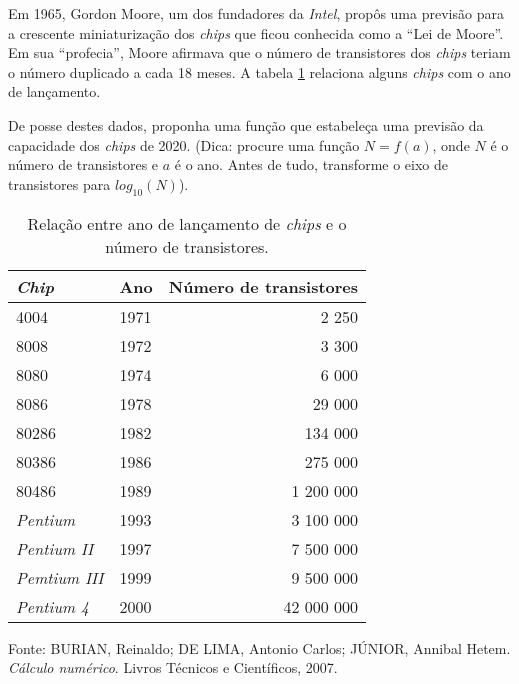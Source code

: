 \begin{ex}
Em 1965, Gordon Moore, um dos fundadores da \emph{Intel}, propôs uma previsão para a crescente miniaturização dos \emph{chips} que ficou conhecida como a ``Lei de Moore''. Em sua ``profecia'', Moore afirmava que o número de transistores dos \emph{chips} teriam o número duplicado a cada 18 meses. A tabela \ref{chips} relaciona alguns \emph{chips} com o ano de lançamento.


De posse destes dados, proponha uma função que estabeleça uma previsão da capacidade dos \emph{chips} de 2020. (Dica: procure uma função $N=f(a)$, onde $N$ é o número de transistores e $a$ é o ano. Antes de tudo, transforme o eixo de transistores para $log_{10}(N)$).
\begin{table}[]
\centering
\caption{Relação entre ano de lançamento de \emph{chips} e o número de transistores.}
\label{chips}
\begin{tabular}{@{}llr@{}}
\toprule
\emph{Chip}        & Ano  & Número de transistores \\ \midrule
4004                 & 1971 & 2 250                  \\
8008                 & 1972 & 3 300                  \\
8080                 & 1974 & 6 000                  \\
8086                 & 1978 & 29 000                 \\
80286                & 1982 & 134 000                \\
80386                & 1986 & 275 000                \\
80486                & 1989 & 1 200 000              \\
\emph{Pentium}     & 1993 & 3 100 000              \\
\emph{Pentium II}  & 1997 & 7 500 000              \\
\emph{Pemtium III} & 1999 & 9 500 000              \\
\emph{Pentium 4}   & 2000 & 42 000 000             \\ \bottomrule
\end{tabular}


Fonte: BURIAN, Reinaldo; DE LIMA, Antonio Carlos; JÚNIOR, Annibal Hetem. \emph{Cálculo numérico}. Livros Técnicos e Científicos, 2007.
\end{table}

\end{ex}

%
%
%